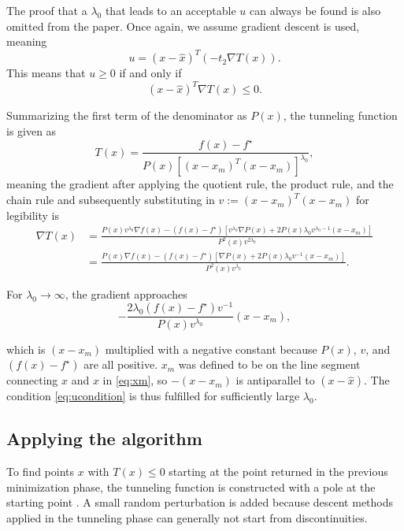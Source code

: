 \documentclass[a4paper,12pt,twoside]{article}
\begin{document}
The proof that a $\lambda_0$ that leads to an acceptable $u$ can always be found is also omitted from the paper. Once again, we assume gradient descent is used, meaning 
\[
u = (x - \hat x)^T (-t_2 \nabla T(x)) .
\]
This means that $u \geq 0$ if and only if
\begin{equation}
    \label{eq:ucondition}
    (x - \hat x)^T \nabla T(x) \leq 0.
\end{equation}

Summarizing the first term of the denominator as $P(x)$, the tunneling function is given as 
\[
T(x) = \frac{f(x) - f^\star}{P(x) [(x-x_m)^T(x-x_m)]^{\lambda_0}},
\]
meaning the gradient after applying the quotient rule, the product rule, and the chain rule and subsequently substituting in $v := (x-x_m)^T(x-x_m)$ for legibility is 
\begin{align*}
    \nabla T(x) &= \frac{P(x) v^{\lambda_0} \nabla f(x) 
    - (f(x) - f^\star)  
    [v^{\lambda_0} \nabla P(x)  + 2P(x) \lambda_0v^{\lambda_0 - 1} (x-x_m) ]  }
    {P^2(x) v^{2\lambda_0}}    \\
    &= \frac{P(x) \nabla f(x) 
    - (f(x) - f^\star)  [ \nabla P(x)  + 2 P(x) \lambda_0 v^{- 1} (x-x_m) ]  }
    {P^2(x) v^{\lambda_0}}.
\end{align*}

For $\lambda_0 \to \infty$, the gradient approaches 
\begin{equation} \label{eq:gradapprox}
    -\frac{2\lambda_0(f(x) - f^\star)v^{-1}}{P(x)v^{\lambda_0}}(x-x_m),
\end{equation}

which is $(x-x_m)$ multiplied with a negative constant because $P(x)$, $v$, and $(f(x) - f^\star)$ are all positive. $x_m$ was defined to be on the line segment connecting $\hat x$ and $x$ in \eqref{eq:xm}, so $-(x-x_m)$ is antiparallel to $(x - \hat x)$. The condition \eqref{eq:ucondition} is thus fulfilled for sufficiently large $\lambda_0$.

\subsection{Applying the algorithm}
To find points $x$ with $T(x) \leq 0$ starting at the point returned in the previous minimization phase, the tunneling function is constructed with a pole at the starting point \cite[26--27]{levy_tunneling_1985}. A small random perturbation is added because descent methods applied in the tunneling phase can generally not start from discontinuities.
\end{document}
